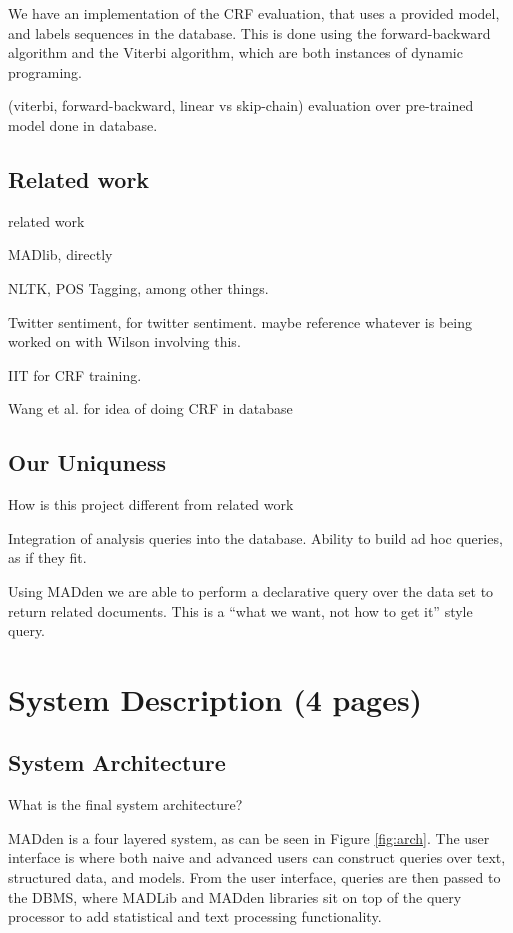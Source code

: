 \documentclass{article}
\newcommand{\system}{MADden\xspace}
\begin{document}
\begin{enumerate}
\begin{enumerate}
    We have an implementation of the CRF evaluation, that uses a provided model, and labels sequences in the database.
    This is done using the forward-backward algorithm and the Viterbi algorithm, which are both instances of dynamic programing.

    (viterbi, forward-backward, linear vs skip-chain) evaluation over pre-trained model done in database.

  \end{enumerate}
  \subsection{Related work}

  related work

  MADlib, directly

  NLTK, POS Tagging, among other things.

  Twitter sentiment, for twitter sentiment. maybe reference whatever is being worked on with Wilson involving this.

  IIT for CRF training.

  Wang et al. for idea of doing CRF in database

  \subsection{Our Uniquness}
  How is this project different from related work

  Integration of analysis queries into the database.
  Ability to build ad hoc queries, as if they fit.

  Using {\system} we are able to perform a declarative query over the data set to return related documents.
  This is a ``what we want, not how to get it'' style query.

  \section{System Description (4 pages)}
  \subsection{System Architecture}
  What is the final system architecture?

  {\system} is a four layered system, as can be seen in Figure \ref{fig:arch}.
  The user interface is where both naive and advanced users can construct queries over text, structured data, and models.
  From the user interface,
  queries are then passed to the DBMS,
  where MADLib and {\system} libraries sit on top of the query processor to add statistical and text processing functionality.



\end{enumerate}
\end{document}
